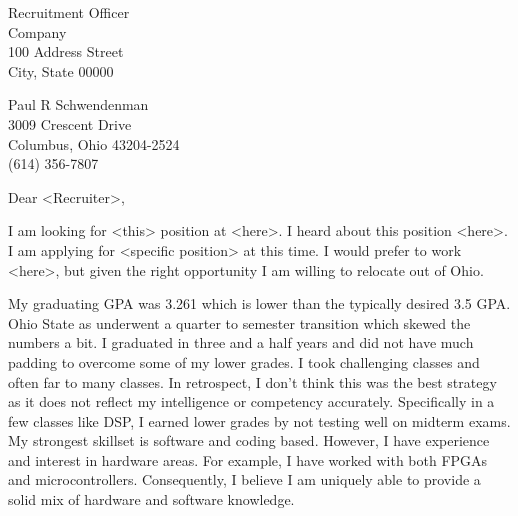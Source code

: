 \documentclass[11pt]{letter} %
\begin{document}

\begin{letter}{Recruitment Officer \\
Company \\
100 Address Street\\
City, State 00000} 



\begin{center}
Paul R Schwendenman \\ %
3009 Crescent Drive \\ Columbus, Ohio 43204-2524 \\ (614) 356-7807 %
\end{center} 
\vfill

\signature{Paul Schwendenman} %


\opening{Dear <Recruiter>,} 

I am looking for <this> position at <here>. I heard about this position
<here>. I am applying for <specific position> at this time.  I would prefer to work
<here>, but given the right opportunity I am willing to
relocate out of Ohio.
 
My graduating GPA was 3.261 which is lower than the typically desired 3.5
GPA.  Ohio State as underwent a quarter to semester transition which skewed
the numbers a bit.  I graduated in three and a half years and did not have
much padding to overcome some of my lower grades.  I took challenging
classes and often far to many classes.  In retrospect, I don't think this
was the best strategy as it does not reflect my intelligence or competency
accurately.  Specifically in a few classes like DSP, I earned lower grades
by not testing well on midterm exams.  My strongest skillset is software and
coding based.  However, I have experience and interest in hardware areas. 
For example, I have worked with both FPGAs and microcontrollers. 
Consequently, I believe I am uniquely able to provide a solid mix of
hardware and software knowledge.


\end{letter}
\end{document}
